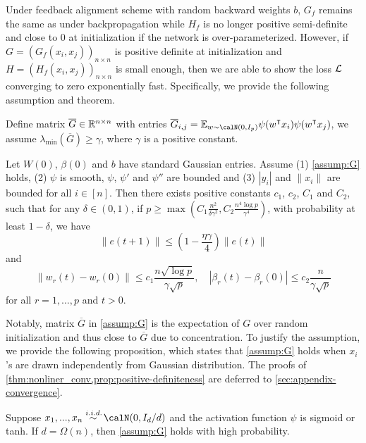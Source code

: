 Under feedback alignment scheme with random backward weights $b$, $G_f$ remains the same as under backpropagation while $H_f$ is no longer positive semi-definite and close to $0$ at initialization if the network is over-parameterized. However, if $G = (G_f(x_i,x_j))_{n\times n}$ is positive definite at initialization and $H = (H_f(x_i,x_j))_{n\times n}$ is small enough, then we are able to show the loss $\mathcal{L}$ converging to zero exponentially fast. Specifically, we provide the following assumption and theorem.

\begin{assumption}\label{assump:G}
Define matrix $\overline{G} \in \mathbb{R}^{n\times n}$ with entries
$\overline{G}_{i,j} = \E_{w\sim \calN(0,I_p)}\psi(w\transpose x_i) \psi(w\transpose  x_j)$, we assume $\lambda_{\min}(\overline{G}) \geq \gamma$, where $\gamma$ is a positive constant.
\end{assumption}

\begin{theorem}\label{thm:nonliner_conv}
Let $W(0)$, $\beta(0)$ and $b$ have \iid standard Gaussian entries. Assume \textnormal{(1)} \cref{assump:G} holds, \textnormal{(2)} $\psi$ is smooth, $\psi$, $\psi'$ and $\psi''$ are bounded and \textnormal{(3)} $|y_i|$ and $\|x_i\|$ are bounded for all $i\in[n]$. Then there exists positive constants $c_1$, $c_2$, $C_1$ and $C_2$, such that for any $\delta\in(0,1)$, if $p \geq \max(C_1\frac{n^2}{\delta\gamma^2}, C_2\frac{n^4\log p}{\gamma^4})$, with probability at least $1-\delta$, we have
\begin{equation}\label{eq:conv}
    \|e(t+1)\| \leq (1-\frac{\eta\gamma}{4})\|e(t)\|
\end{equation}
and 
\begin{equation}
\label{eq:weights}
    \|w_r(t)-w_r(0)\| \leq c_1\frac{n\sqrt{\log p}}{\gamma\sqrt p}, \quad |\beta_r(t)-\beta_r(0)| \leq c_2\frac{n}{\gamma\sqrt p}
\end{equation}
for all $r=1,\ldots, p$ and $t>0$.
\end{theorem}

Notably, matrix $\overline{G}$ in \cref{assump:G} is the expectation of $G$ over random initialization and thus close to $\overline{G}$ due to concentration. To justify the assumption, we provide the following proposition, which states that \cref{assump:G} holds when $x_i$'s are drawn independently from Gaussian distribution. The proofs of \cref{thm:nonliner_conv,prop:positive-definiteness} are deferred to \cref{sec:appendix-convergence}.

\begin{proposition}\label{prop:positive-definiteness}
Suppose $x_1,...,x_n \overset{\iid}{\sim} \calN(0,I_d/d)$ and the activation function $\psi$ is sigmoid or tanh. If $d=\Omega(n)$, then \cref{assump:G} holds with high probability.
\end{proposition}




